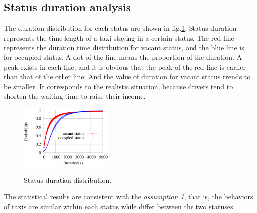 \subsection{Status duration analysis}
  The duration distribution for each status are shown in fig.\ref{figure_duration_for_each_status}. Status duration represents the time length of a taxi staying in a certain status. The red line represents the duration time distribution for vacant status, and the blue line is for occupied status. A dot of the line means the proportion of the duration. A peak exists in each line, and it is obvious that the peak of the red line is earlier than that of the other line. And the value of duration for vacant status trends to be smaller. It corresponds to the realistic situation, because drivers tend to shorten the waiting time to raise their income.
\begin{figure}[!h]
\centering
\includegraphics[width=0.4\textwidth]{figures_201103/assumption/durationdis.eps}\\
\caption{Status duration distribution.}\label{figure_duration_for_each_status}
\end{figure}

The statistical results are consistent with the \emph{assumption 1}, that is, the behaviors of taxis are similar within each status while differ between the two statuses.
